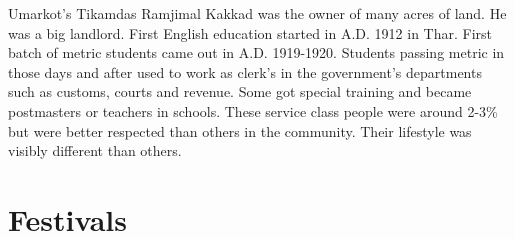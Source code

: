 Umarkot's Tikamdas Ramjimal Kakkad was the owner of many acres of land. He was a big landlord. First English education started in A.D. 1912 in Thar. First batch of metric students came out in A.D. 1919-1920. Students passing metric  in those days and after used to work as clerk's in the government's departments such as customs, courts and revenue. Some got special training and became postmasters or teachers in schools. These service class people were around 2-3\% but were better respected than others in the community. Their lifestyle was visibly different than others.
\section{Festivals}
